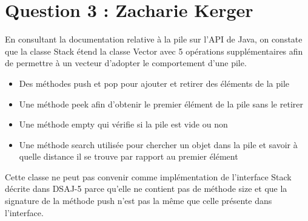 \section*{Question 3 : Zacharie Kerger}
En consultant la documentation relative à la pile sur l'API de Java, on constate que la classe Stack étend la classe Vector avec 5 opérations supplémentaires afin de permettre à un vecteur d'adopter le comportement d'une pile.

\begin{itemize}

\item Des méthodes push et pop pour ajouter et retirer des éléments de la pile
\item Une méthode peek afin d'obtenir le premier élément de la pile sans le retirer
\item Une méthode empty qui vérifie si la pile est vide ou non
\item Une méthode search utilisée pour chercher un objet dans la pile et savoir à quelle distance il se trouve par rapport au premier élément

\end{itemize}

Cette classe ne peut pas convenir comme implémentation de l'interface Stack décrite dans DSAJ-5 parce qu'elle ne contient pas de méthode size et que la signature de la méthode push n'est pas la même que celle présente dans l'interface.


